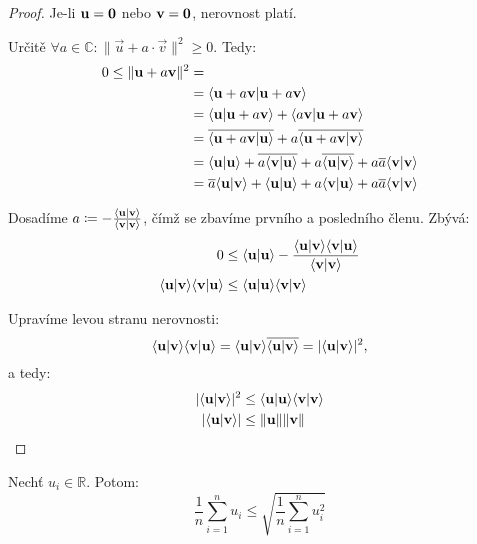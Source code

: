 \begin{proof}
    Je-li $\mathbf{u} = \mathbf{0}$ nebo $\mathbf{v} = \mathbf{0}$, nerovnost platí. 
    
    Určitě $\forall a \in \mathbb{C}: \|\vec{u} + a\cdot\vec{v}\|^2 \geq 0$.
    Tedy:
    \begin{align*}
        0 \leq \|\mathbf{u} + a\mathbf{v}\|^2 &= \\
        &= \langle \mathbf{u} + a\mathbf{v} | \mathbf{u} + a\mathbf{v} \rangle \\
        &= \langle \mathbf{u} | \mathbf{u} + a\mathbf{v} \rangle + \langle a\mathbf{v} | \mathbf{u} 
            + a\mathbf{v} \rangle \\
        &= \overline{\langle \mathbf{u} + a\mathbf{v} | \mathbf{u} \rangle} + a
            \overline{\langle \mathbf{u} + a \mathbf{v} | \mathbf{v} \rangle} \\
        &= \langle \mathbf{u} | \mathbf{u} \rangle + \overline{a \langle \mathbf{v} | \mathbf{u} \rangle} + 
            a \overline{\langle \mathbf{u} | \mathbf{v} \rangle} + a  \overline{a}
            \langle \mathbf{v} | \mathbf{v} \rangle \\
        &= \overline{a}\langle \mathbf{u} | \mathbf{v} \rangle + \langle \mathbf{u} | \mathbf{u} \rangle +
            a\langle \mathbf{v} | \mathbf{u} \rangle + a\overline{a}\langle \mathbf{v} | \mathbf{v} \rangle
    \end{align*}

    Dosadíme 
    $a \coloneqq -\frac{\langle \mathbf{u} | \mathbf{v} \rangle}{\langle \mathbf{v} | \mathbf{v} \rangle}$,
    čímž se zbavíme prvního a posledního členu. Zbývá:
    \begin{align*}
        0 &\leq \langle \mathbf{u} | \mathbf{u} \rangle 
        -\frac{\langle \mathbf{u} | \mathbf{v} \rangle\langle \mathbf{v} | \mathbf{u} \rangle}
        {\langle \mathbf{v} | \mathbf{v} \rangle} \\
        \langle \mathbf{u} | \mathbf{v} \rangle\langle \mathbf{v} | \mathbf{u} \rangle &\leq
        \langle \mathbf{u} | \mathbf{u} \rangle\langle \mathbf{v} | \mathbf{v} \rangle
    \end{align*}

    Upravíme levou stranu nerovnosti:
    $$\langle \mathbf{u} | \mathbf{v} \rangle\langle \mathbf{v} | \mathbf{u} \rangle = 
        \langle \mathbf{u} | \mathbf{v} \rangle\overline{\langle \mathbf{u} | \mathbf{v} \rangle} =
        |\langle \mathbf{u} | \mathbf{v} \rangle|^2,$$
    a tedy:
    \begin{align*}
        |\langle \mathbf{u} | \mathbf{v} \rangle|^2 &\leq
        \langle \mathbf{u} | \mathbf{u} \rangle\langle \mathbf{v} | \mathbf{v} \rangle \\
        |\langle \mathbf{u} | \mathbf{v} \rangle| &\leq \|\mathbf{u}\|\|\mathbf{v}\|
    \end{align*}
\end{proof}

\begin{corollary}
    Nechť $u_i \in \mathbb{R}$. Potom:
    $$\frac{1}{n}\sum_{i=1}^n u_i \leq \sqrt{\frac{1}{n}\sum_{i=1}^{n} u_i^2}$$
\end{corollary}

